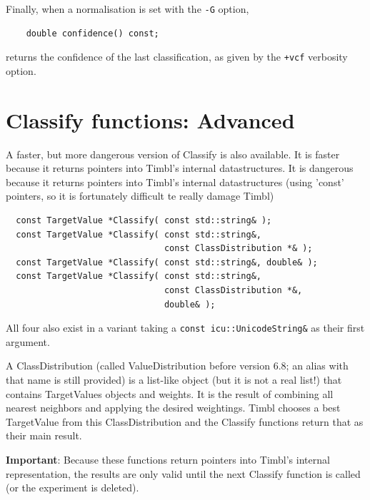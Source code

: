 \documentclass{report}
\begin{document}
Finally, when a normalisation is set with the {\tt -G} option,

\begin{footnotesize}
\begin{verbatim}
    double confidence() const;
\end{verbatim}
\end{footnotesize}

returns the confidence of the last classification, as given by the
{\tt +vcf} verbosity option.

\section{Classify functions: Advanced}
\label{advanced}

A faster, but more dangerous version of Classify is also available.
It is faster because it returns pointers into Timbl's internal
datastructures. It is dangerous because it returns pointers into
Timbl's internal datastructures (using 'const' pointers, so it is
fortunately difficult te really damage Timbl)

\begin{footnotesize}
\begin{verbatim}
  const TargetValue *Classify( const std::string& );
  const TargetValue *Classify( const std::string&,
                               const ClassDistribution *& );
  const TargetValue *Classify( const std::string&, double& );
  const TargetValue *Classify( const std::string&,
                               const ClassDistribution *&,
                               double& );
\end{verbatim}
\end{footnotesize}

All four also exist in a variant taking a {\tt const
  icu::UnicodeString\&} as their first argument.

A ClassDistribution (called ValueDistribution before version 6.8; an
alias with that name is still provided) is a list-like object (but it
is not a real list!) that contains TargetValues objects and
weights. It is the result of combining all nearest neighbors and
applying the desired weightings.  Timbl chooses a best TargetValue
from this ClassDistribution and the Classify functions return that as
their main result.

{\bf Important}: Because these functions return pointers into Timbl's
internal representation, the results are only valid until the next
Classify function is called (or the experiment is deleted).
\end{document}
